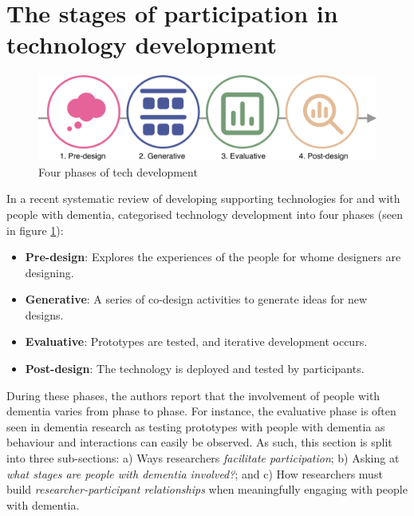\section{The stages of participation in technology development}
\label{BL:StagesofTech}

\begin{figure}[htp]
    \centering
    \includegraphics[width=0.8\linewidth]{Images/ChapterTwo/PhasesOfTech.png}
    \caption{Four phases of tech development \citep{suijkerbuijk_active_2019}}
    \label{fig:PhasesOfTech}
\end{figure}
In a recent systematic review of developing supporting technologies for and with people with dementia, \cite{suijkerbuijk_active_2019} categorised technology development into four phases (seen in figure \ref{fig:PhasesOfTech}):

\begin{itemize}
    \item \textbf{Pre-design}: Explores the experiences of the people for whome designers are designing.
    \item \textbf{Generative}: A series of co-design activities to generate ideas for new designs.
    \item \textbf{Evaluative}: Prototypes are tested, and iterative development occurs.
    \item \textbf{Post-design}: The technology is deployed and tested by participants.
\end{itemize}

During these phases, the authors report that the involvement of people with dementia varies from phase to phase. For instance, the evaluative phase is often seen in dementia research as testing prototypes with people with dementia as behaviour and interactions can easily be observed. As such, this section is split into three sub-sections: a) Ways researchers \textit{facilitate participation}; b) Asking at \textit{what stages are people with dementia involved?}; and c) How researchers must build \textit{researcher-participant relationships} when meaningfully engaging with people with dementia.

